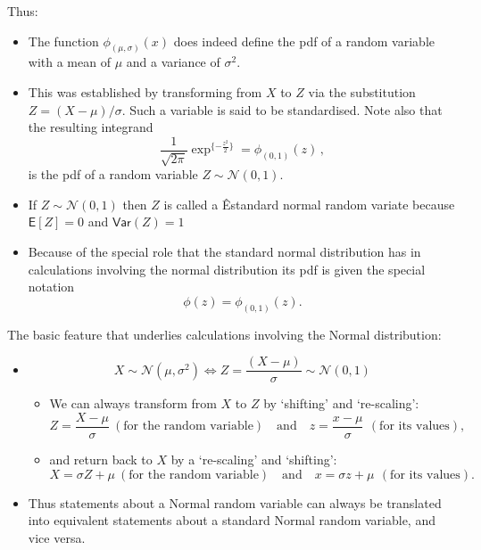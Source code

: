 \documentclass[notes=show,smaller,handout]{beamer}\usepackage[]{graphicx}\usepackage[]{color}
\newcommand{\N}{\mathcal{N}}
\newenvironment{stepitemize}{\begin{itemize}[<+->]}{\end{itemize} }
\begin{document}
\begin{frame}{\subsecname}
  Thus:
  \begin{itemize}
    \item The function $\phi_{(\mu,\sigma)}(x)$ does indeed define the pdf of a random variable with a mean of $\mu$ and a variance of $\sigma^2$.
  \item This was established by transforming from $X$ to $Z$ via the substitution $Z=(X-\mu)/\sigma$. Such a variable
  is said to be standardised. Note also that the resulting integrand
  $$
  \frac{1}{\sqrt{2\pi}}\exp^{\{-\frac{z^2}{2}\}}=\phi_{(0,1)}(z)\,,
  $$
  is the pdf of a random variable $Z\sim \N(0,1)$.
  \item If $Z\sim \N(0,1)$ then $Z$ is called a \color{blue}Êstandard normal random variate \color{black} because
  $
  \textsf{E}[Z]=0$ and $\textsf{Var}(Z)=1$

  \item Because of the special role that the standard normal distribution has in
  calculations involving the normal distribution its pdf is given the special notation
  $$\phi(z)=\phi_{(0,1)}(z).$$
  \end{itemize}
\end{frame}

\begin{frame}{\subsecname}
  The basic feature that underlies calculations involving the Normal distribution:
  \begin{stepitemize}
  \item $$X\sim \N\left( \mu ,\sigma ^{2}\right)\Leftrightarrow Z=\frac{\left( X-\mu \right) }{\sigma }\sim \N\left( 0,1\right)$$
  \begin{stepitemize}
  \item We can always transform from $X$ to $Z$  by  `shifting' and `re-scaling':%
  \begin{equation*}
  Z=\frac{X-\mu }{\sigma } \ (\text{for the random variable}) \quad\mbox{and}\quad z=\frac{x-\mu }{\sigma }\,  \ (\text{for its values}) ,
  \end{equation*}
  \item and return back to $X$ by a `re-scaling' and `shifting':%
  \begin{equation*}
  X=\sigma Z+\mu  \ (\text{for the random variable}) \quad\mbox{and}\quad x=\sigma z+\mu\, \ (\text{for its values}) .
  \end{equation*}
  \end{stepitemize}
  \item Thus statements about a Normal random variable can always be translated into equivalent statements about a standard Normal random variable, and vice versa.
  \end{stepitemize}
\end{frame}
\end{document}
